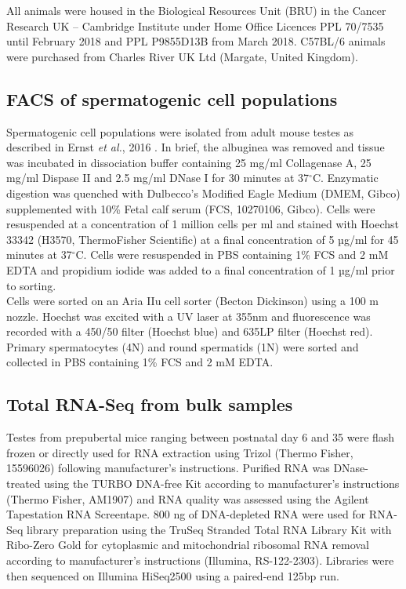 All animals were housed in the Biological Resources Unit (BRU) in the Cancer Research UK – Cambridge Institute under Home Office Licences PPL 70/7535 until February 2018 and PPL P9855D13B from March 2018. 
C57BL/6 animals were purchased from Charles River UK Ltd (Margate, United Kingdom).
 
\subsection{FACS of spermatogenic cell populations}
\label{appA.2.sorting}

Spermatogenic cell populations were isolated from adult mouse testes as described in Ernst \emph{et al.}, 2016 \citep{Ernst2016}. 
In brief, the albuginea was removed and tissue was incubated in dissociation buffer containing 25 mg/ml Collagenase A, 25 mg/ml Dispase II and 2.5 mg/ml DNase I for 30 minutes at 37$^\circ$C. Enzymatic digestion was quenched with Dulbecco’s Modified Eagle Medium (DMEM, Gibco) supplemented with 10\% Fetal calf serum (FCS, 10270106, Gibco). 
Cells were resuspended at a concentration of 1 million cells per ml and stained with Hoechst 33342 (H3570, ThermoFisher Scientific) at a final concentration of 5 µg/ml for 45 minutes at 37$^\circ$C. 
Cells were resuspended in PBS containing 1\% FCS and 2 mM EDTA and propidium iodide was added to a final concentration of 1 µg/ml prior to sorting. \\
Cells were sorted on an Aria IIu cell sorter (Becton Dickinson) using a 100 \textmu{}m nozzle. 
Hoechst was excited with a UV laser at 355nm and fluorescence was recorded with a 450/50 filter (Hoechst blue) and 635LP filter (Hoechst red). 
Primary spermatocytes (4N) and round spermatids (1N) were sorted and collected in PBS containing 1\% FCS and 2 mM EDTA. 

\subsection{Total RNA-Seq from bulk samples}
\label{appA.2.bulk}

Testes from prepubertal mice ranging between postnatal day 6 and 35 were flash frozen or directly used for RNA extraction using Trizol (Thermo Fisher, 15596026) following manufacturer’s instructions. 
Purified RNA was DNase-treated using the TURBO DNA-free Kit according to manufacturer’s instructions (Thermo Fisher, AM1907) and RNA quality was assessed using the Agilent Tapestation RNA Screentape. 
800 ng of DNA-depleted RNA were used for RNA-Seq library preparation using the TruSeq Stranded Total RNA Library Kit with Ribo-Zero Gold for cytoplasmic and mitochondrial ribosomal RNA removal according to manufacturer’s instructions (Illumina, RS-122-2303). 
Libraries were then sequenced on Illumina HiSeq2500 using a paired-end 125bp run. 

